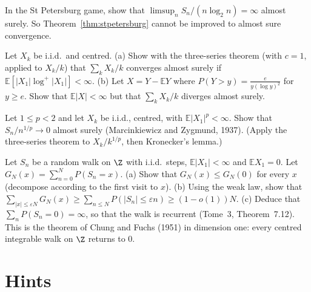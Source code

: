 \begin{exercise}[$\star\star$]\label{ex:stpeteas}
In the St Petersburg game, show that $\limsup_nS_n/(n\log_2n)=\infty$ almost surely. So Theorem~\ref{thm:stpetersburg} cannot be improved to almost sure
convergence.
\end{exercise}

\begin{exercise}[$\star\star$]\label{ex:seriesiid}
Let $X_k$ be i.i.d.\ and centred. (a) Show with the three-series theorem (with $c=1$, applied to $X_k/k$) that $\sum_kX_k/k$ converges almost surely
if $\mathbb E[|X_1|\log^+|X_1|]<\infty$. (b) Let $X=Y-\mathbb E Y$ where $P(Y>y)=\frac e{y(\log y)^2}$ for $y\ge e$. Show that $\mathbb E|X|<\infty$ but that
$\sum_kX_k/k$ diverges almost surely.
\end{exercise}

\begin{exercise}[$\star\star\star$]\label{ex:mz}
Let $1\le p<2$ and let $X_k$ be i.i.d., centred, with $\mathbb E|X_1|^p<\infty$. Show that $S_n/n^{1/p}\to0$ almost surely (Marcinkiewicz and
Zygmund, 1937). (Apply the three-series theorem to $X_k/k^{1/p}$, then Kronecker's lemma.)
\end{exercise}

\begin{exercise}[$\star\star\star$]\label{ex:chungfuchs}
Let $S_n$ be a random walk on $\Z$ with i.i.d.\ steps, $\mathbb E|X_1|<\infty$ and $\mathbb E X_1=0$. Let $G_N(x)=\sum_{n=0}^NP(S_n=x)$. (a) Show that
$G_N(x)\le G_N(0)$ for every $x$ (decompose according to the first visit to $x$). (b) Using the weak law, show that
$\sum_{|x|\le\varepsilon N}G_N(x)\ge\sum_{n\le N}P(|S_n|\le\varepsilon n)\ge(1-o(1))N$. (c) Deduce that $\sum_nP(S_n=0)=\infty$, so that the walk is recurrent
(Tome~3, Theorem~7.12). This is the theorem of Chung and Fuchs (1951) in dimension one: every centred integrable walk on $\Z$ returns to $0$.
\end{exercise}

\section{Hints}

